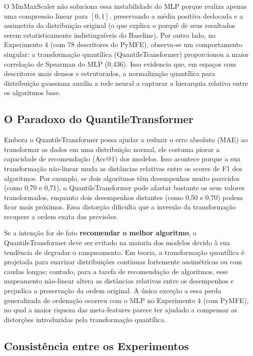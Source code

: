 \documentclass[12pt]{article}
\begin{document}
O MinMaxScaler não soluciona essa instabilidade do MLP porque realiza apenas uma compressão linear para $[0, 1]$, preservando a média positiva deslocada e a assimetria da distribuição original (o que explica o porquê de seus resultados serem estatisticamente indistinguíveis do Baseline). Por outro lado, no Experimento 4 (com 78 descritores do PyMFE), observa-se um comportamento singular: a transformação quantílica (QuantileTransformer) proporcionou a maior correlação de Spearman do MLP (0,436). Isso evidencia que, em espaços com descritores mais densos e estruturados, a normalização quantílica para distribuição gaussiana auxilia a rede neural a capturar a hierarquia relativa entre os algoritmos base.

\subsection{O Paradoxo do QuantileTransformer}

Embora o QuantileTransformer possa ajudar a reduzir o erro absoluto (MAE) ao transformar os dados em uma distribuição normal, ele costuma piorar a capacidade de recomendação (Acc@1) dos modelos. Isso acontece porque a sua transformação não-linear muda as distâncias relativas entre os scores de F1 dos algoritmos. Por exemplo, se dois algoritmos têm desempenhos muito parecidos (como 0,70 e 0,71), o QuantileTransformer pode afastar bastante os seus valores transformados, enquanto dois desempenhos distantes (como 0,50 e 0,70) podem ficar mais próximos. Essa distorção dificulta que a inversão da transformação recupere a ordem exata das previsões.

Se a intenção for de fato \textbf{recomendar o melhor algoritmo}, o QuantileTransformer deve ser evitado na maioria dos modelos devido à sua tendência de degradar o ranqueamento. Em teoria, a transformação quantílica é projetada para suavizar distribuições contínuas fortemente assimétricas ou com caudas longas; contudo, para a tarefa de recomendação de algoritmos, esse mapeamento não-linear altera as distâncias relativas entre os desempenhos e prejudica a preservação da ordem original. A única exceção a essa perda generalizada de ordenação ocorreu com o MLP no Experimento 4 (com PyMFE), no qual a maior riqueza das meta-features parece ter ajudado a compensar as distorções introduzidas pela transformação quantílica.

\clearpage
\subsection{Consistência entre os Experimentos}
\end{document}
